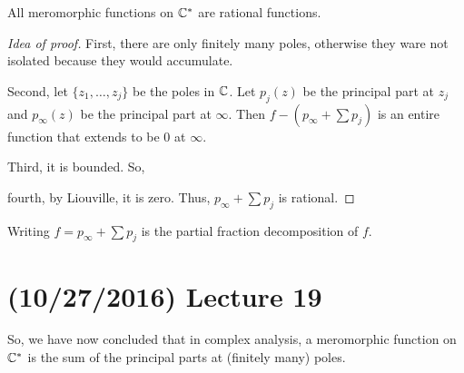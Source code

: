 \documentclass[11pt,leqno,oneside]{amsart}
\begin{document}
  \begin{prop}
    All meromorphic functions on ${\mathbb C}^*$ are rational functions.
  \end{prop}
  \begin{proof}[Idea of proof]
    First, there are only finitely many poles, otherwise they ware not
    isolated because they would accumulate.

    Second, let $\{z_1, \ldots, z_j\}$ be the poles in ${\mathbb C}$. Let
    $p_j(z)$ be the principal part at $z_j$ and $p_\infty(z)$ be the
    principal part at $\infty$. Then $f - (p_\infty + \sum p_j)$ is an
    entire function that extends to be 0 at $\infty$.

    Third, it is bounded. So,

    fourth, by Liouville, it is zero. Thus, $p_\infty + \sum p_j$ is rational.
  \end{proof}
  Writing $f = p_\infty + \sum p_j$ is the partial fraction
  decomposition of $f$.
  \section{(10/27/2016) Lecture 19}
  So, we have now concluded that in complex analysis, a meromorphic
  function on ${\mathbb C}^*$ is the sum of the principal parts at (finitely
  many) poles.
\end{document}
